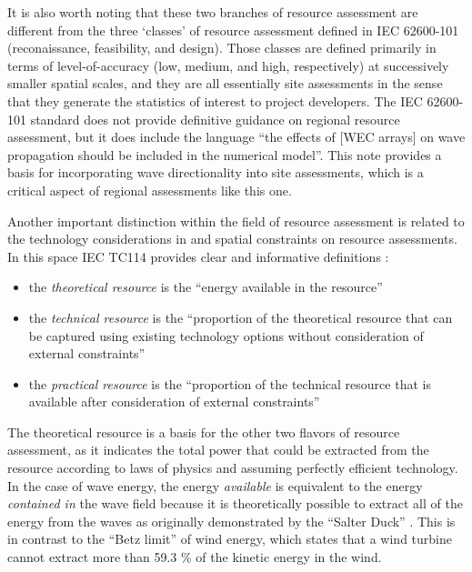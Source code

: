 It is also worth noting that these two branches of resource assessment are different from the three `classes' of resource assessment defined in IEC 62600-101 (reconaissance, feasibility, and design). Those classes are defined primarily in terms of level-of-accuracy (low, medium, and high, respectively) at successively smaller spatial scales, and they are all essentially site assessments in the sense that they generate the statistics of interest to project developers.
The IEC 62600-101 standard does not provide definitive guidance on regional resource assessment, but it does include the language ``the effects of [WEC arrays] on wave propagation should be included in the numerical model''. This note provides a basis for incorporating wave directionality into site assessments, which is a critical aspect of regional assessments like this one.

Another important distinction within the field of resource assessment is related to the technology considerations in and spatial constraints on resource assessments. In this space IEC TC114 provides clear and informative definitions \citep{internationalelectrotechnicalcommissionPartTerminologyEdition2020}:
\begin{itemize}
  \item the {\it theoretical resource} is the ``energy available in the resource''
  \item the {\it technical resource} is the ``proportion of the theoretical resource that can be captured using existing technology options without consideration of external constraints''
  \item the {\it practical resource} is the ``proportion of the technical resource that is available after consideration of external constraints''
\end{itemize}

The theoretical resource is a basis for the other two flavors of resource assessment, as it indicates the total power that could be extracted from the resource according to laws of physics and assuming perfectly efficient technology. In the case of wave energy, the energy {\em available} is equivalent to the energy {\em contained in} the wave field because it is theoretically possible to extract all of the energy from the waves as originally demonstrated by the ``Salter Duck'' \citep{salterRecentProgressDucks1980} . This is in contrast to the ``Betz limit'' of wind energy, which states that a wind turbine cannot extract more than 59.3 \% of the kinetic energy in the wind.

